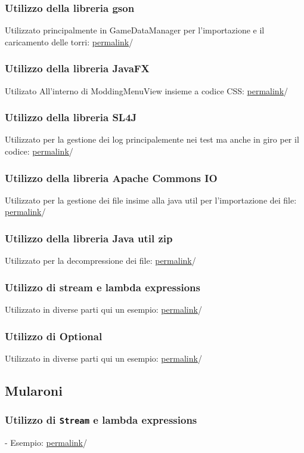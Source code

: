 \documentclass[a4paper,12pt]{report}
\begin{document}
\subsubsection{Utilizzo della libreria gson}
Utilizzato principalmente in GameDataManager per l'importazione e il caricamento delle torri: \href{https://google.com}{permalink}/ 
\subsubsection{Utilizzo della libreria JavaFX}
Utilizato All'interno di ModdingMenuView insieme a codice CSS: \href{https://google.com}{permalink}/ 
\subsubsection{Utilizzo della libreria SL4J}
Utilizzato per la gestione dei log principalemente nei test ma anche in giro per il codice: \href{https://google.com}{permalink}/ 
\subsubsection{Utilizzo della libreria Apache Commons IO}
Utilizzato per la gestione dei file insime alla java util per l'importazione dei file: \href{https://google.com}{permalink}/ 
\subsubsection{Utilizzo della libreria Java util zip}
Utilizzato per la decompressione dei file: \href{https://google.com}{permalink}/ 
\subsubsection{Utilizzo di stream e lambda expressions}
Utilizzato in diverse parti qui un esempio: \href{https://google.com}{permalink}/ 
\subsubsection{Utilizzo di Optional}
Utilizzato in diverse parti qui un esempio: \href{https://google.com}{permalink}/ 

\subsection{Mularoni}
\subsubsection{Utilizzo di \texttt{Stream} e lambda expressions} - Esempio: \href{https://google.com}{permalink}/ 
\end{document}

